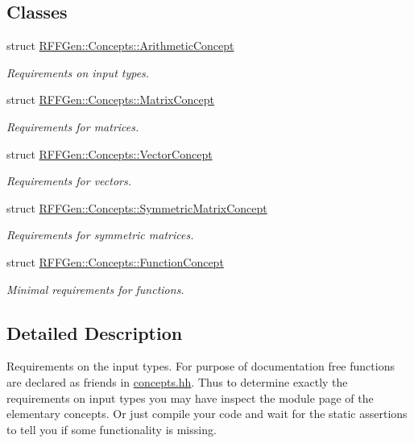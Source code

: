\subsection*{Classes}
\begin{DoxyCompactItemize}
\item 
struct \hyperlink{structRFFGen_1_1Concepts_1_1ArithmeticConcept}{R\-F\-F\-Gen\-::\-Concepts\-::\-Arithmetic\-Concept}
\begin{DoxyCompactList}\small\item\em Requirements on input types. \end{DoxyCompactList}\item 
struct \hyperlink{structRFFGen_1_1Concepts_1_1MatrixConcept}{R\-F\-F\-Gen\-::\-Concepts\-::\-Matrix\-Concept}
\begin{DoxyCompactList}\small\item\em Requirements for matrices. \end{DoxyCompactList}\item 
struct \hyperlink{structRFFGen_1_1Concepts_1_1VectorConcept}{R\-F\-F\-Gen\-::\-Concepts\-::\-Vector\-Concept}
\begin{DoxyCompactList}\small\item\em Requirements for vectors. \end{DoxyCompactList}\item 
struct \hyperlink{structRFFGen_1_1Concepts_1_1SymmetricMatrixConcept}{R\-F\-F\-Gen\-::\-Concepts\-::\-Symmetric\-Matrix\-Concept}
\begin{DoxyCompactList}\small\item\em Requirements for symmetric matrices. \end{DoxyCompactList}\item 
struct \hyperlink{structRFFGen_1_1Concepts_1_1FunctionConcept}{R\-F\-F\-Gen\-::\-Concepts\-::\-Function\-Concept}
\begin{DoxyCompactList}\small\item\em Minimal requirements for functions. \end{DoxyCompactList}\end{DoxyCompactItemize}


\subsection{Detailed Description}
Requirements on the input types. For purpose of documentation free functions are declared as friends in \hyperlink{concepts_8hh}{concepts.\-hh}. Thus to determine exactly the requirements on input types you may have inspect the module page of the elementary concepts. Or just compile your code and wait for the static assertions to tell you if some functionality is missing. 